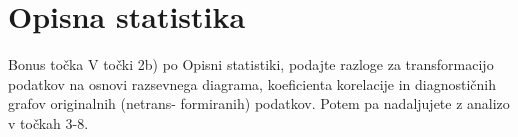 \section{Opisna statistika}

Bonus točka V točki 2b) po Opisni statistiki, podajte razloge za transformacijo podatkov na
osnovi razsevnega diagrama, koeficienta korelacije in diagnostičnih grafov originalnih (netrans-
formiranih) podatkov. Potem pa nadaljujete z analizo v točkah 3-8.